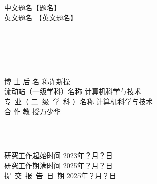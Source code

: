 \newpage
{
    \fontsize{10.5}{10.5}\selectfont
    \quad\\
    \quad\\
}

{
    \fontsize{18}{18}\selectfont
    \noindent
    中文题名\uline{\qquad 【题名】\qquad} \\

    \noindent
    英文题名\uline{{
    \fontsize{12}{12}\selectfont
    \qquad【英文题名】\qquad
    }}
}

{
    \fontsize{18}{18}\selectfont
    \quad\\
    \quad\\ 
    \quad\\
    \quad\\
}

{
    \fontsize{18}{18}\selectfont
    \noindent
    博\quad\; 士\quad\; 后\quad\; 名\quad\; 称\uline{\qquad \quad 许新操 \quad \qquad} \\

    \noindent
    流动站（一级学科）名称\uline{\; 计算机科学与技术\;} \\

    \noindent
    专\ 业（ 二\ 级\ 学\ 科 ）名称\uline{\; 计算机科学与技术} \\

    \noindent
    合\qquad\; 作\qquad\; 教\qquad\; 授\uline{\qquad \quad 万少华 \quad \qquad} \\
}

{
    \fontsize{18}{18}\selectfont
    \quad\\
    \quad\\
}



{
    \fontsize{18}{18}\selectfont
    \noindent
    研究工作起始时间 \uline{\; 2023年？月？日} \\

    \noindent
    研究工作期满时间\uline{\; 2025年？月？日} \\

    \noindent
    提\, 交\, 报\, 告\, 日\, 期\uline{\; 2025年？月？日} \\
}